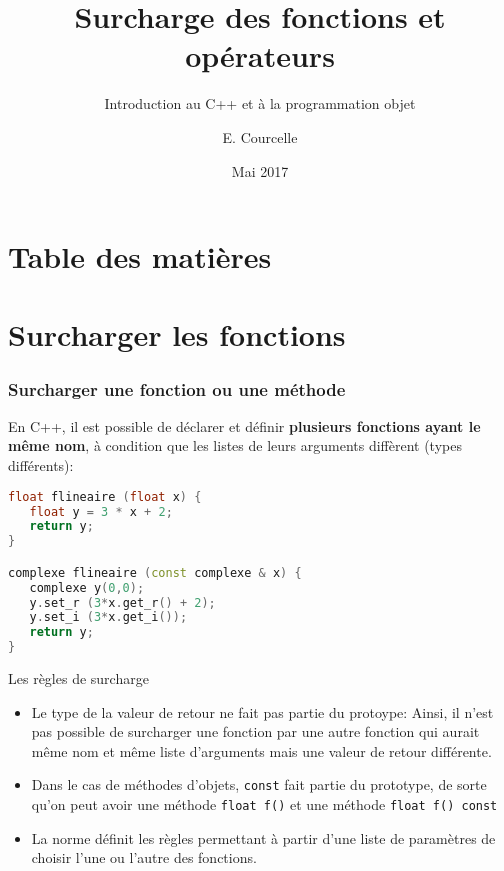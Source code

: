 \documentclass{beamer}
\title{Surcharge des fonctions et opérateurs}
\subtitle{Introduction au C++ et à la programmation objet}
\author{E. Courcelle}\institute{CALMIP, UMS 3669}
\date{Mai 2017}
\begin{document}
\begin{frame}
\titlepage
\end{frame}

\section*{Table des matières}
\begin{frame}
\tableofcontents
\end{frame}


\section{Surcharger les fonctions}

\begin{frame}[fragile=singleslide,shrink=20]
\frametitle {Surcharger une fonction ou une méthode}

En C++, il est possible de déclarer et définir \textbf{plusieurs fonctions ayant le même nom}, à condition que les listes de leurs arguments diffèrent (types différents):

\begin{lstlisting}[language=c++]
float flineaire (float x) {                   
   float y = 3 * x + 2;
   return y;
}

complexe flineaire (const complexe & x) {
   complexe y(0,0);
   y.set_r (3*x.get_r() + 2);
   y.set_i (3*x.get_i());
   return y;
}
\end{lstlisting}

\begin{block}{Les règles de surcharge}
\begin{itemize}
\item{Le type de la valeur de retour ne fait pas partie du protoype: Ainsi, il n'est pas possible de surcharger une fonction par une autre fonction qui aurait même nom et même liste d'arguments mais une valeur de retour différente.}
\item{Dans le cas de méthodes d'objets, \texttt{const} fait partie du prototype, de sorte qu'on peut avoir une méthode \texttt{float f()} et une méthode \texttt{float f() const} }
\item{La norme définit les règles permettant à partir d'une liste de paramètres de choisir l'une ou l'autre des fonctions.}
\end{itemize}
\end{block}
\end{frame}
\end{document}
